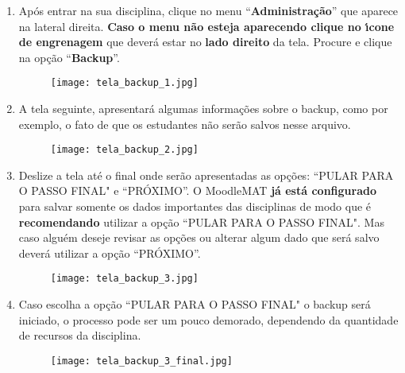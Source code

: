 \documentclass[12pt]{report}
\begin{document}
\begin{enumerate}[\bf 1)]
	\item Ap\'os entrar na sua disciplina, clique no menu ``\textbf{Administra\c{c}\~ao}'' que aparece na lateral direita. \textbf{Caso o menu n\~ao esteja aparecendo clique no {\'\i}cone de engrenagem} que dever\'a estar no \textbf{lado direito} da tela. Procure e clique na op\c{c}\~ao ``\textbf{Backup}''.
	\begin{figure}[H]
    	\centering
    	\hspace*{-2.5cm}\texttt{[image: tela\_backup\_1.jpg]}
  	\end{figure}

	\newpage

	\item A tela seguinte, apresentar\'a algumas informa\c{c}\~oes sobre o backup, como por exemplo, o fato de que os estudantes n\~ao ser\~ao salvos nesse arquivo.
	\begin{figure}[H]
    	\centering
    	\hspace*{-2.5cm}\texttt{[image: tela\_backup\_2.jpg]}
  	\end{figure}

  	\newpage

	\item Deslize a tela at\'e o final onde ser\~ao apresentadas as op\c{c}\~oes: ``PULAR PARA O PASSO FINAL" e ``PR\'OXIMO''. O MoodleMAT \textbf{j\'a est\'a configurado} para salvar somente os dados importantes das disciplinas de modo que \'e \textbf{recomendando} utilizar a op\c{c}\~ao ``PULAR PARA O PASSO FINAL". Mas caso algu\'em deseje revisar as op\c{c}\~oes ou alterar algum dado que ser\'a salvo dever\'a utilizar a op\c{c}\~ao ``PR\'OXIMO''.
	\begin{figure}[H]
    	\centering
    	\hspace*{-2.5cm}\texttt{[image: tela\_backup\_3.jpg]}
  	\end{figure}

  	\newpage

	\item Caso escolha a op\c{c}\~ao ``PULAR PARA O PASSO FINAL" o backup ser\'a iniciado, o processo pode ser um pouco demorado, dependendo da quantidade de recursos da disciplina.
	\begin{figure}[H]
    	\centering
    	\hspace*{-2.5cm}\texttt{[image: tela\_backup\_3\_final.jpg]}
  	\end{figure}


\end{enumerate}
\end{document}
